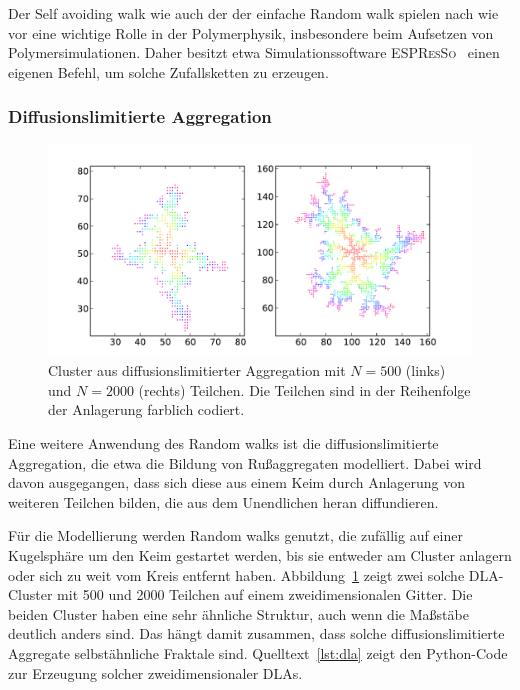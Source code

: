 Der Self avoiding walk wie auch der der einfache Random walk spielen
nach wie vor eine wichtige Rolle in der Polymerphysik, insbesondere
beim Aufsetzen von Polymersimulationen. Daher besitzt etwa
Simulationssoftware \textsc{ESPResSo}~\cite{espresso} einen eigenen
Befehl, um solche Zufallsketten zu erzeugen.

\subsubsection{Diffusionslimitierte Aggregation}

\begin{figure}
  \centering
  \includegraphics[width=\textwidth]{plots/dla}
  \caption{Cluster aus diffusionslimitierter Aggregation mit $N=500$
    (links) und $N=2000$ (rechts) Teilchen. Die Teilchen sind in der
    Reihenfolge der Anlagerung farblich codiert.}
  \label{fig:dla}
\end{figure}

Eine weitere Anwendung des Random walks ist die diffusionslimitierte
Aggregation, die etwa die Bildung von Rußaggregaten modelliert. Dabei
wird davon ausgegangen, dass sich diese aus einem Keim durch
Anlagerung von weiteren Teilchen bilden, die aus dem Unendlichen heran
diffundieren.

Für die Modellierung werden Random walks genutzt, die zufällig auf
einer Kugelsphäre um den Keim gestartet werden, bis sie entweder am
Cluster anlagern oder sich zu weit vom Kreis entfernt
haben. Abbildung~\ref{fig:dla} zeigt zwei solche DLA-Cluster mit 500
und 2000 Teilchen auf einem zweidimensionalen Gitter. Die beiden
Cluster haben eine sehr ähnliche Struktur, auch wenn die Maßstäbe
deutlich anders sind. Das hängt damit zusammen, dass solche
diffusionslimitierte Aggregate selbstähnliche Fraktale
sind. Quelltext~\ref{lst:dla} zeigt den Python-Code zur Erzeugung
solcher zweidimensionaler DLAs.

